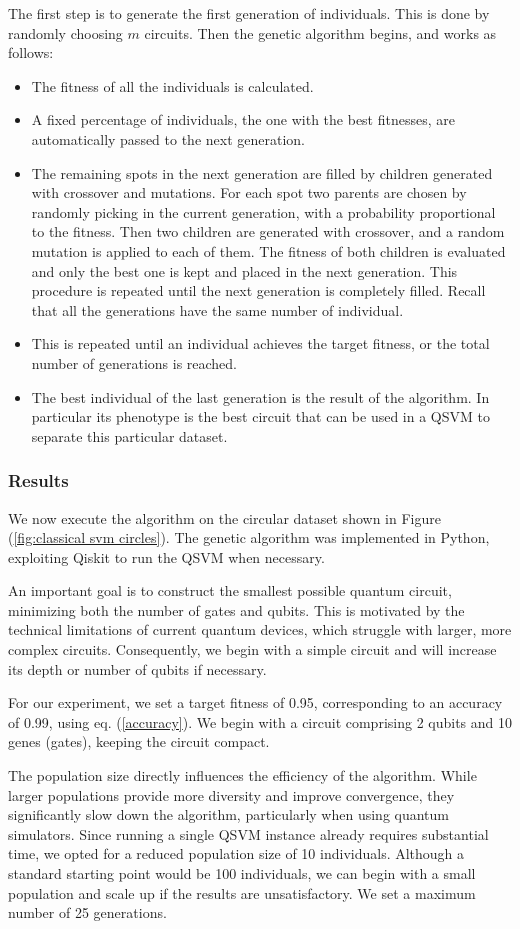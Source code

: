 \documentclass[12pt]{article}
\begin{document}
The first step is to generate the first generation of individuals. This is done by randomly choosing $m$ circuits. Then the genetic algorithm begins, and works as follows:
\begin{itemize}
    \item The fitness of all the individuals is calculated.
    \item A fixed percentage of individuals, the one with the best fitnesses, are automatically passed to the next generation. 
    \item The remaining spots in the next generation are filled by children generated with crossover and mutations. For each spot two parents are chosen by randomly picking in the current generation, with a probability proportional to the fitness. Then two children are generated with crossover, and a random mutation is applied to each of them. The fitness of both children is evaluated and only the best one is kept and placed in the next generation. This procedure is repeated until the next generation is completely filled. Recall that all the generations have the same number of individual.
    \item This is repeated until an individual achieves the target fitness, or the total number of generations is reached.
    \item The best individual of the last generation is the result of the algorithm. In particular its phenotype is the best circuit that can be used in a QSVM to separate this particular dataset. 
\end{itemize}


\subsubsection{Results}

We now execute the algorithm on the circular dataset shown in Figure (\ref{fig:classical svm circles}). The genetic algorithm was implemented in Python, exploiting Qiskit to run the QSVM when necessary.

An important goal is to construct the smallest possible quantum circuit, minimizing both the number of gates and qubits. This is motivated by the technical limitations of current quantum devices, which struggle with larger, more complex circuits. Consequently, we begin with a simple circuit and will increase its depth or number of qubits if necessary.

For our experiment, we set a target fitness of 0.95, corresponding to an accuracy of 0.99, using eq. (\ref{accuracy}). We begin with a circuit comprising 2 qubits and 10 genes (gates), keeping the circuit compact.

The population size directly influences the efficiency of the algorithm. While larger populations provide more diversity and improve convergence, they significantly slow down the algorithm, particularly when using quantum simulators. Since running a single QSVM instance already requires substantial time, we opted for a reduced population size of 10 individuals. Although a standard starting point would be 100 individuals, we can begin with a small population and scale up if the results are unsatisfactory. We set a maximum number of 25 generations.
\end{document}

